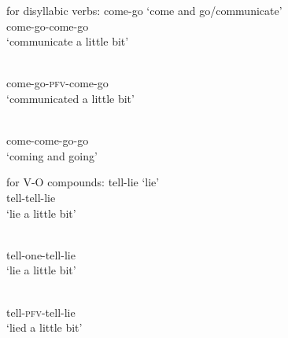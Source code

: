 \ex\label{ex:forms-di} for disyllabic verbs:  come-go `come and go/communicate'
		\ea \gll {}\\
		come-go-come-go\\ 
        \glt `communicate a little bit'
        
		\ex \gll {}\\
		come-go-\textsc{pfv}-come-go\\ 
        \glt `communicated a little bit'
        
		\ex \gll {}\\
		come-come-go-go\\ 
        \glt `coming and going'
		\z

\ex\label{ex:forms-vo} for V-O compounds:  tell-lie `lie'
		\ea \gll {}\\
		tell-tell-lie\\ 
        \glt `lie a little bit'
        
		\ex \gll {}\\
		tell-one-tell-lie\\ 
        \glt `lie a little bit'
        
		\ex \gll {}\\
		tell-\textsc{pfv}-tell-lie\\ 
        \glt `lied a little bit'        
		\z
\z




